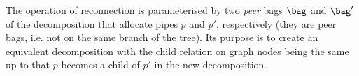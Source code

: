 {


%


\begin{description}[leftmargin=2mm]
\item[Reconnection.]
The operation of reconnection is parameterised by two \emph{peer} bags $\bag$ and $\bag'$ of the decomposition that allocate pipes $p$ and $p'$, respectively (they are peer bags, i.e. not on the same branch of the tree).
Its purpose is to create an equivalent decomposition with the child relation on graph nodes being the same up to that $p$ becomes a child of $p'$ in the new decomposition.



\end{description}}
